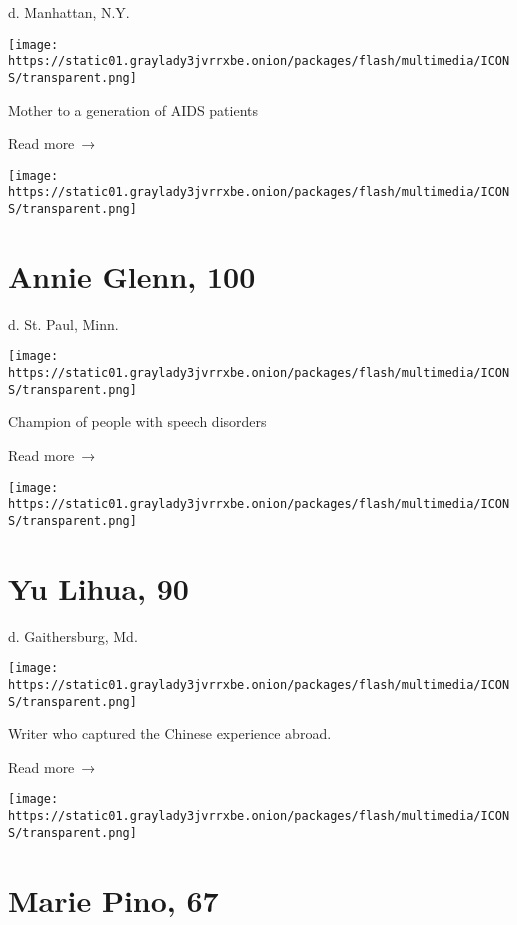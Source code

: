 d. Manhattan, N.Y.

\texttt{[image: https://static01.graylady3jvrrxbe.onion/packages/flash/multimedia/ICONS/transparent.png]}

Mother to a generation of AIDS patients

 Read more~→

\href{https://www.nytimes3xbfgragh.onion/2020/05/19/us/annie-glenn-champion-of-those-with-speech-disorders-dies-at-100.html}{}

\texttt{[image: https://static01.graylady3jvrrxbe.onion/packages/flash/multimedia/ICONS/transparent.png]}

\hypertarget{annie-glenn-100}{%
\section{Annie Glenn, 100}\label{annie-glenn-100}}

d. St. Paul, Minn.

\texttt{[image: https://static01.graylady3jvrrxbe.onion/packages/flash/multimedia/ICONS/transparent.png]}

Champion of people with speech disorders

 Read more~→

\href{https://www.nytimes3xbfgragh.onion/2020/05/19/world/asia/yu-lihua-90-dies-writer-spoke-to-rootless-chinese-emigres.html}{}

\texttt{[image: https://static01.graylady3jvrrxbe.onion/packages/flash/multimedia/ICONS/transparent.png]}

\hypertarget{yu-lihua-90}{%
\section{Yu Lihua, 90}\label{yu-lihua-90}}

d. Gaithersburg, Md.

\texttt{[image: https://static01.graylady3jvrrxbe.onion/packages/flash/multimedia/ICONS/transparent.png]}

Writer who captured the Chinese experience abroad.

 Read more~→

\href{https://www.nytimes3xbfgragh.onion/2020/05/19/obituaries/marie-pino-dead-coronavirus.html}{}

\texttt{[image: https://static01.graylady3jvrrxbe.onion/packages/flash/multimedia/ICONS/transparent.png]}

\hypertarget{marie-pino-67}{%
\section{Marie Pino, 67}\label{marie-pino-67}}

